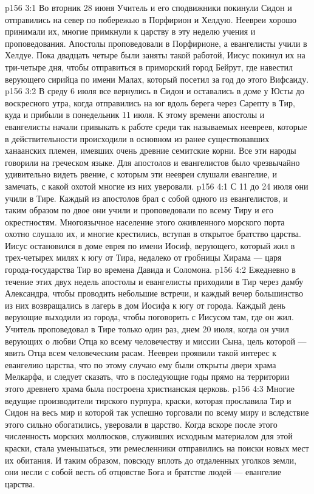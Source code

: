 \vs p156 3:1 Во вторник 28 июня Учитель и его сподвижники покинули Сидон и отправились на север по побережью в Порфирион и Хелдую. Неевреи хорошо принимали их, многие примкнули к царству в эту неделю учения и проповедования. Апостолы проповедовали в Порфирионе, а евангелисты учили в Хелдуе. Пока двадцать четыре были заняты такой работой, Иисус покинул их на три\hyp{}четыре дня, чтобы отправиться в приморский город Бейрут, где навестил верующего сирийца по имени Малах, который посетил за год до этого Вифсаиду.
\vs p156 3:2 В среду 6 июля все вернулись в Сидон и оставались в доме у Юсты до воскресного утра, когда отправились на юг вдоль берега через Сарепту в Тир, куда и прибыли в понедельник 11 июля. К этому времени апостолы и евангелисты начали привыкать к работе среди так называемых неевреев, которые в действительности происходили в основном из ранее существовавших ханаанских племен, имевших очень древние семитские корни. Все эти народы говорили на греческом языке. Для апостолов и евангелистов было чрезвычайно удивительно видеть рвение, с которым эти неевреи слушали евангелие, и замечать, с какой охотой многие из них уверовали.
\vs p156 4:1 С 11 до 24 июля они учили в Тире. Каждый из апостолов брал с собой одного из евангелистов, и таким образом по двое они учили и проповедовали по всему Тиру и его окрестностям. Многоязычное население этого оживленного морского порта охотно слушало их, и многие крестились, вступая в открытое братство царства. Иисус остановился в доме еврея по имени Иосиф, верующего, который жил в трех\hyp{}четырех милях к югу от Тира, недалеко от гробницы Хирама --- царя города\hyp{}государства Тир во времена Давида и Соломона.
\vs p156 4:2 Ежедневно в течение этих двух недель апостолы и евангелисты приходили в Тир через дамбу Александра, чтобы проводить небольшие встречи, и каждый вечер большинство из них возвращались в лагерь в дом Иосифа к югу от города. Каждый день верующие выходили из города, чтобы поговорить с Иисусом там, где он жил. Учитель проповедовал в Тире только один раз, днем 20 июля, когда он учил верующих о любви Отца ко всему человечеству и миссии Сына, цель которой --- явить Отца всем человеческим расам. Неевреи проявили такой интерес к евангелию царства, что по этому случаю ему были открыты двери храма Мелкарфа, и следует сказать, что в последующие годы прямо на территории этого древнего храма была построена христианская церковь.
\vs p156 4:3 Многие ведущие производители тирского пурпура, краски, которая прославила Тир и Сидон на весь мир и которой так успешно торговали по всему миру и вследствие этого сильно обогатились, уверовали в царство. Когда вскоре после этого численность морских моллюсков, служивших исходным материалом для этой краски, стала уменьшаться, эти ремесленники отправились на поиски новых мест их обитания. И таким образом, повсюду вплоть до отдаленных уголков земли, они несли с собой весть об отцовстве Бога и братстве людей --- евангелие царства.
